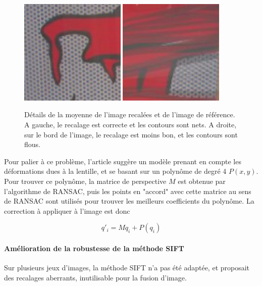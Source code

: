 \documentclass[12pt,a4paper]{article}
\begin{document}
\begin{figure}[H]
  \centering
  \includegraphics[width=0.45\textwidth]{Fig/Recalage_OK.png}
  \includegraphics[width=0.45\textwidth]{Fig/Recalage_flou.png}
  \caption{Détails de la moyenne de l'image recalées et de l'image de référence. A gauche, le recalage est correcte et les contours sont nets. A droite, sur le bord de l'image, le recalage est moins bon, et les contours sont flous.}
\end{figure}

Pour palier à ce problème, l'article suggère un modèle prenant en compte les déformations dues à la lentille, et se basant sur un polynôme de degré 4 $P(x,y)$. Pour trouver ce polynôme, la matrice de perspective $M$ est obtenue par l'algorithme de RANSAC, puis les points en "accord" avec cette matrice au sens de RANSAC sont utilisés pour trouver les meilleurs coefficients du polynôme. La correction à appliquer à l'image est donc 

$$ q'_i = M q_i + P(q_i) $$

\paragraph{Amélioration de la robustesse de la méthode SIFT}
Sur plusieurs jeux d'images, la méthode SIFT n'a pas été adaptée, et proposait des recalages aberrants, inutilisable pour la fusion d'image.
\end{document}

